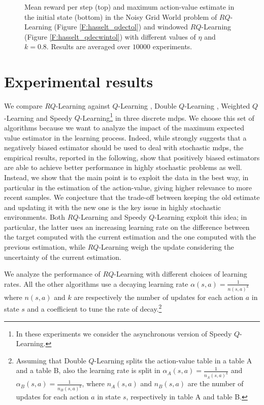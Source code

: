 \begin{figure}[t]
\begin{minipage}{\columnwidth}
\end{minipage}
  \caption[Noisy Grid World $RQ$-Learning variants comparison - 2]{Mean reward per step (top) and maximum action-value estimate in the initial state (bottom) in the Noisy Grid World problem of $RQ$-Learning (Figure \ref{F:hasselt_qdectol}) and windowed $RQ$-Learning (Figure \ref{F:hasselt_qdecwintol}) with different values of $\eta$ and $k = 0.8$. Results are averaged over $10000$ experiments.}
  \label{F:hasselt_QDecTol}
\end{figure}

\section{Experimental results}\label{S:empirical}
We compare $RQ$-Learning against $Q$-Learning \cite{watkins1989learning}, Double $Q$-Learning \cite{van2010double}, Weighted $Q$-Learning \cite{deramo2016estimating} and Speedy $Q$-Learning\footnote{In these experiments we consider the asynchronous version of Speedy $Q$-Learning.} \cite{NIPS2011_4251} in three discrete \glspl{mdp}. We choose this set of algorithms because we want to analyze the impact of the maximum expected value estimator in the learning process. Indeed, while \cite{van2010double} strongly suggests that a negatively biased estimator should be used to deal with stochastic \glspl{mdp}, the  empirical results, reported in the following, show that positively biased estimators are able to achieve better performance in highly stochastic problems as well. Instead, we show that the main point is to exploit the data in the best way, in particular in the estimation of the action-value, giving higher relevance to more recent samples. We conjecture that the trade-off between keeping the old estimate and updating it with the new one is the key issue in highly stochastic environments. Both $RQ$-Learning and Speedy $Q$-Learning exploit this idea; in particular, the latter uses an increasing learning rate on the difference between the target computed with the current estimation and the one computed with the previous estimation, while $RQ$-Learning weigh the update considering the uncertainty of the current estimation.

We analyze the performance of $RQ$-Learning with different choices of learning rates. All the other algorithms use a decaying learning rate $\alpha(s, a) = \frac{1}{n(s, a)^{k}}$ where $n(s, a)$ and $k$ are respectively the number of updates for each action $a$ in state $s$ and a coefficient to tune the rate of decay.\footnote{Assuming that Double $Q$-Learning splits the action-value table in a table A and a table B, also the learning rate is split in $\alpha_A(s, a) = \frac{1}{n_A(s, a)^{k}}$ and $\alpha_B(s, a) = \frac{1}{n_B(s, a)^{k}}$, where $n_A(s, a)$ and $n_B(s, a)$ are the number of updates for each action $a$ in state $s$, respectively in table A and table B.}

